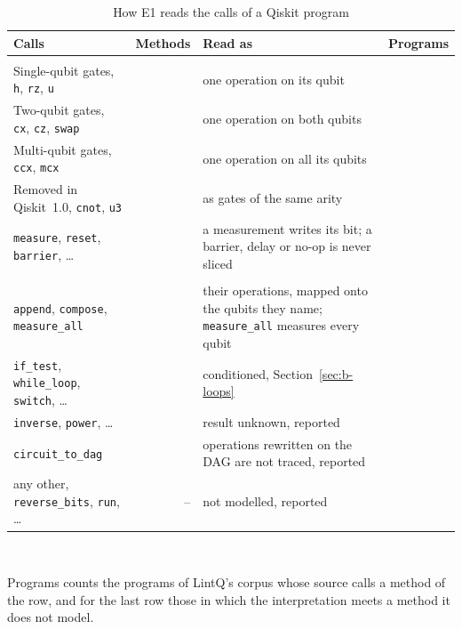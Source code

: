 \begin{table}[t]
  \centering
  \caption{How E1 reads the calls of a Qiskit program}
  \label{tab:b-roles}
  \footnotesize\setlength{\tabcolsep}{2.6pt}\renewcommand{\arraystretch}{1.12}
  \newcommand{\sep}{\arrayrulecolor{black!25}\hline\arrayrulecolor{black}}
  \newcommand{\blk}[1]{\rowcolor{black!8}\multicolumn{4}{@{}l}{\textit{#1}}\\}
  \begin{tabular}{@{}>{\raggedright\arraybackslash}p{2.75cm} r >{\raggedright\arraybackslash}p{2.95cm} r@{}}
    \toprule
    \rowcolor{black!8}\textbf{Calls} & \textbf{Methods} & \textbf{Read as} & \textbf{Programs} \\
    \midrule
    \blk{In the role table}
    Single-qubit gates, \texttt{h}, \texttt{rz}, \texttt{u} & \numKindSingleN{} & one operation on its qubit & \numCallsSingle{} \\ \sep
    Two-qubit gates, \texttt{cx}, \texttt{cz}, \texttt{swap} & \numKindTwoN{} & one operation on both qubits & \numCallsTwo{} \\ \sep
    Multi-qubit gates, \texttt{ccx}, \texttt{mcx} & \numKindMultiN{} & one operation on all its qubits & \numCallsMulti{} \\ \sep
    Removed in Qiskit~1.0, \texttt{cnot}, \texttt{u3} & \numKindLegacyN{} & as gates of the same arity & \numCallsLegacy{} \\ \sep
    \texttt{measure}, \texttt{reset}, \texttt{barrier}, \ldots & \numKindSpecialN{} & a measurement writes its bit; a barrier, delay or no-op is never sliced & \numCallsSpecial{} \\
    \midrule
    \blk{Outside the role table}
    \texttt{append}, \texttt{compose}, \texttt{measure\_all} & \numKindComposeN{} & their operations, mapped onto the qubits they name; \texttt{measure\_all} measures every qubit & \numCallsCompose{} \\ \sep
    \texttt{if\_test}, \texttt{while\_loop}, \texttt{switch}, \ldots & \numKindFlowN{} & conditioned, Section~\ref{sec:b-loops} & \numCallsFlow{} \\ \sep
    \texttt{inverse}, \texttt{power}, \ldots & \numKindTransformN{} & result unknown, reported & \numCallsTransform{} \\ \sep
    \texttt{circuit\_to\_dag} & \numKindDagN{} & operations rewritten on the DAG are not traced, reported & \numCallsDag{} \\ \sep
    any other, \texttt{reverse\_bits}, \texttt{run}, \ldots & -- & not modelled, reported & \numUnmodMethodProgs{} \\
    \bottomrule
  \end{tabular}\\[3pt]
  \begin{minipage}{\columnwidth}\footnotesize
  Programs counts the programs of LintQ's corpus whose source calls a method of the row, and for the last row those in
  which the interpretation meets a method it does not model.
  \end{minipage}
\end{table}

